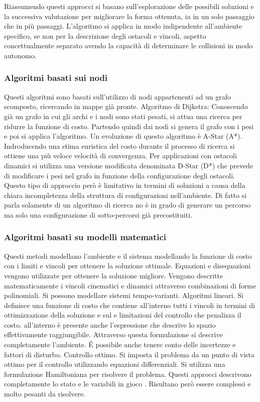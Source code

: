 Riassumendo questi approcci si basano sull'esplorazione delle possibili soluzioni e la successiva valutazione per migliorare la forma ottenuta, ia in un solo passaggio che in più passaggi. L'algoritmo si applica in modo indipendente all'ambiente specifico, se non per la descrizione degli ostacoli e vincoli, aspetto concettualmente separato avendo la capacità di determinare le collisioni in modo autonomo.


\subsubsection{Algoritmi basati sui nodi}
Questi algoritmi sono basati sull'utilizzo di nodi appartenenti ad un grafo scomposto, ricercando in mappe già pronte.
Algoritmo di Dijkstra: Conoscendo già un grafo in cui gli archi e i nodi sono stati pesati, si attua una ricerca per ridurre la funzione di costo. Partendo quindi dai nodi si genera il grafo con i pesi e poi si applica l'algoritmo. Un evoluzione di questo algoritmo è A-Star (A*). Indroducendo una stima euristica del costo durante il processo di ricerca si ottiene una più veloce velocità di convergenza. Per applicazioni con ostacoli dinamici si utilizza una versione modificata denominata D-Star (D*) che prevede di modificare i pesi nel grafo in funzione della configurazione degli ostacoli. Questo tipo di approccio però è limitativo in termini di soluzioni a causa della chiara incompletezza della struttura di configurazioni nell'ambiente. Di fatto si parla solamente di un algoritmo di ricerca no è in grado di generare un percorso ma solo una configurazione di sotto-percorsi già precostituiti.

\subsubsection{Algoritmi basati su modelli matematici}
Questi metodi modellano l'ambiente  e il sistema modellando la funzione di costo con i limiti e vincoli per ottenere la soluzione ottimale. Equazioni e disequazioni vengono utilizzate per ottenere la soluzione migliore.
Vengono descritte matematicamente i vincoli cinematici e dinamici attraverso combinazioni di forme polinomiali. Si possono modellare sistemi tempo-varianti. 
Algoritmi lineari. Si definisce una funzione di costo che contiene all'interno tutti i vincoli in termini di ottimizzazione della soluzione e sul e limitazioni del controllo che penalizza il costo. all'interno è presente anche l'espressione che descrive lo spazio effettivamente raggiungibile. Attraverso questa formulazione si descrive completamente l'ambiente. \'E possibile anche tenere conto delle incertezze e fattori di disturbo.
Controllo ottimo. Si imposta il problema da un punto di vista ottimo per il controllo utilizzando equazioni differenziali. Si utilizza una formulazione Hamiltoniana per risolvere il problema. 
Questi approcci descrivono completamente lo stato e le variabili in gioco . Risultano però essere complessi e molto pesanti da risolvere.

